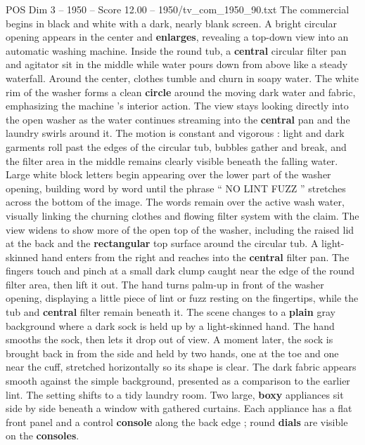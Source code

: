 \begin{textsample}{POS Dim 3 – 1950 – Score 12.00 – 1950/tv\_com\_1950\_90.txt}  \label{ex:f3_pos_016}
The commercial begins in black and white with a dark, nearly blank screen.
A bright circular opening appears in the center and \textbf{enlarges}, revealing a top-down view into an automatic washing machine.
Inside the round tub, a \textbf{central} circular filter pan and agitator sit in the middle while water pours down from above like a steady waterfall.
Around the center, clothes tumble and churn in soapy water.
The white rim of the washer forms a clean \textbf{circle} around the moving dark water and fabric, emphasizing the machine ’s interior action.
The view stays looking directly into the open washer as the water continues streaming into the \textbf{central} pan and the laundry swirls around it.
The motion is constant and vigorous : light and dark garments roll past the edges of the circular tub, bubbles gather and break, and the filter area in the middle remains clearly visible beneath the falling water.
Large white block letters begin appearing over the lower part of the washer opening, building word by word until the phrase “ NO LINT FUZZ ” stretches across the bottom of the image.
The words remain over the active wash water, visually linking the churning clothes and flowing filter system with the claim.
The view widens to show more of the open top of the washer, including the raised lid at the back and the \textbf{rectangular} top surface around the circular tub.
A light-skinned hand enters from the right and reaches into the \textbf{central} filter pan.
The fingers touch and pinch at a small dark clump caught near the edge of the round filter area, then lift it out.
The hand turns palm-up in front of the washer opening, displaying a little piece of lint or fuzz resting on the fingertips, while the tub and \textbf{central} filter remain beneath it.
The scene changes to a \textbf{plain} gray background where a dark sock is held up by a light-skinned hand.
The hand smooths the sock, then lets it drop out of view.
A moment later, the sock is brought back in from the side and held by two hands, one at the toe and one near the cuff, stretched horizontally so its shape is clear.
The dark fabric appears smooth against the simple background, presented as a comparison to the earlier lint.
The setting shifts to a tidy laundry room.
Two large, \textbf{boxy} appliances sit side by side beneath a window with gathered curtains.
Each appliance has a flat front panel and a control \textbf{console} along the back edge ; round \textbf{dials} are visible on the \textbf{consoles}.

\end{textsample}
